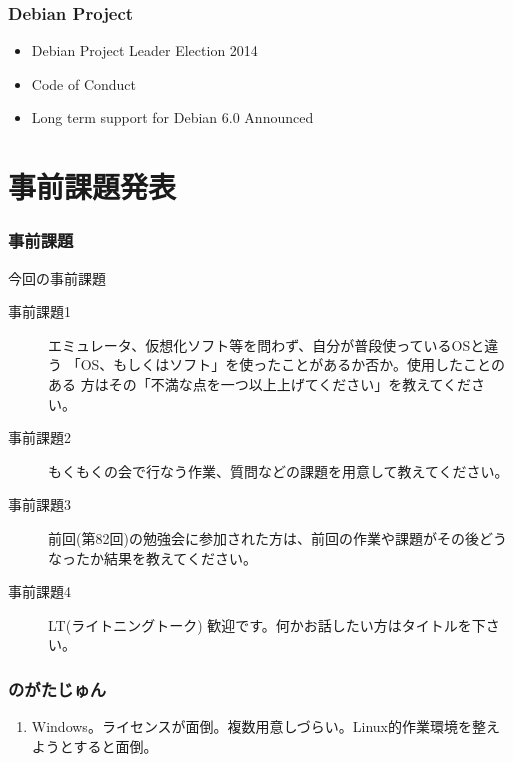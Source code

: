 \documentclass[cjk,dvipdfmx,10pt,compress,%
hyperref={bookmarks=true,bookmarksnumbered=true,bookmarksopen=false,%
colorlinks=false,%
pdftitle={第 82 回 関西 Debian 勉強会},%
pdfauthor={倉敷・のがた・佐々木・かわだ・八津尾},%
pdfsubject={資料},%
}]{beamer}
\begin{document}
\begin{frame}[fragile]
  \frametitle{Debian Project}
  \begin{itemize}
  \item Debian Project Leader Election 2014
  \item Code of Conduct
  \item Long term support for Debian 6.0 Announced
  \end{itemize}
\end{frame}


\section{事前課題発表}


\begin{frame}[fragile]
  \frametitle{事前課題}
  \begin{block}{今回の事前課題}
    \begin{description}
    \item[事前課題1]
      エミュレータ、仮想化ソフト等を問わず、自分が普段使っているOSと違う
      「OS、もしくはソフト」を使ったことがあるか否か。使用したことのある
      方はその「不満な点を一つ以上上げてください」を教えてください。
    \item[事前課題2]
      もくもくの会で行なう作業、質問などの課題を用意して教えてください。
    \item[事前課題3]
      前回(第82回)の勉強会に参加された方は、前回の作業や課題がその後どう
      なったか結果を教えてください。
    \item[事前課題4]
      LT(ライトニングトーク) 歓迎です。何かお話したい方はタイトルを下さい。
    \end{description}
  \end{block}
\end{frame}


\begin{frame}
  \frametitle{ のがたじゅん }
  \begin{enumerate}
  \item Windows。ライセンスが面倒。複数用意しづらい。Linux的作業環境を整えようとすると面倒。
  \end{enumerate}
\end{frame}
\end{document}

